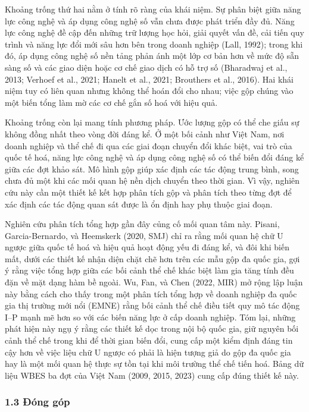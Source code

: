\documentclass[12pt,a4paper]{article}
\begin{document}
Khoảng trống thứ hai nằm ở tính rõ ràng của khái niệm. Sự phân biệt giữa
năng lực công nghệ và áp dụng công nghệ số vẫn chưa được phát triển đầy
đủ. Năng lực công nghệ đề cập đến những trữ lượng học hỏi, giải quyết
vấn đề, cải tiến quy trình và năng lực đổi mới sâu hơn bên trong doanh
nghiệp (Lall, 1992); trong khi đó, áp dụng công nghệ số nền tảng phản
ánh một lớp cơ bản hơn về mức độ sẵn sàng số và các giao diện hoặc cơ
chế giao dịch có hỗ trợ số (Bharadwaj et al., 2013; Verhoef et al.,
2021; Hanelt et al., 2021; Brouthers et al., 2016). Hai khái niệm tuy có
liên quan nhưng không thể hoán đổi cho nhau; việc gộp chúng vào một biến
tổng làm mờ các cơ chế gắn số hoá với hiệu quả.

Khoảng trống còn lại mang tính phương pháp. Ước lượng gộp có thể che
giấu sự không đồng nhất theo vòng đời đáng kể. Ở một bối cảnh như Việt
Nam, nơi doanh nghiệp và thể chế đi qua các giai đoạn chuyển đổi khác
biệt, vai trò của quốc tế hoá, năng lực công nghệ và áp dụng công nghệ
số có thể biến đổi đáng kể giữa các đợt khảo sát. Mô hình gộp giúp xác
định các tác động trung bình, song chưa đủ một khi các mối quan hệ nền
dịch chuyển theo thời gian. Vì vậy, nghiên cứu này cần một thiết kế kết
hợp phân tích gộp và phân tích theo từng đợt để xác định các tác động
quan sát được là ổn định hay phụ thuộc giai đoạn.

Nghiên cứu phân tích tổng hợp gần đây củng cố mối quan tâm này. Pisani,
Garcia-Bernardo, và Heemskerk (2020, SMJ) chỉ ra rằng mối quan hệ chữ U
ngược giữa quốc tế hoá và hiệu quả hoạt động yếu đi đáng kể, và đôi khi
biến mất, dưới các thiết kế nhận diện chặt chẽ hơn trên các mẫu gộp đa
quốc gia, gợi ý rằng việc tổng hợp giữa các bối cảnh thể chế khác biệt
làm gia tăng tính đều đặn về mặt dạng hàm bề ngoài. Wu, Fan, và Chen
(2022, MIR) mở rộng lập luận này bằng cách cho thấy trong một phân tích
tổng hợp về doanh nghiệp đa quốc gia thị trường mới nổi (EMNE) rằng bối
cảnh thể chế điều tiết quy mô tác động I--P mạnh mẽ hơn so với các biến
năng lực ở cấp doanh nghiệp. Tóm lại, những phát hiện này ngụ ý rằng các
thiết kế dọc trong nội bộ quốc gia, giữ nguyên bối cảnh thể chế trong
khi để thời gian biến đổi, cung cấp một kiểm định đáng tin cậy hơn về
việc liệu chữ U ngược có phải là hiện tượng giả do gộp đa quốc gia hay
là một mối quan hệ thực sự tồn tại khi môi trường thể chế tiến hoá. Bảng
dữ liệu WBES ba đợt của Việt Nam (2009, 2015, 2023) cung cấp đúng thiết
kế này.

\hypertarget{13-ux111uxf3ng-guxf3p}{%
\subsubsection{1.3 Đóng góp}\label{13-ux111uxf3ng-guxf3p}}
\end{document}
